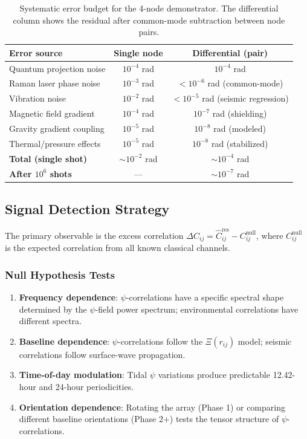 \documentclass[12pt,a4paper]{article}
\theoremstyle{remark}
\begin{document}
\begin{table}[H]
\centering
\begin{tabular}{lcc}
\toprule
\textbf{Error source} & \textbf{Single node} & \textbf{Differential (pair)} \\
\midrule
Quantum projection noise & $10^{-4}$ rad & $10^{-4}$ rad \\
Raman laser phase noise & $10^{-3}$ rad & $< 10^{-6}$ rad (common-mode) \\
Vibration noise & $10^{-2}$ rad & $< 10^{-5}$ rad (seismic regression) \\
Magnetic field gradient & $10^{-4}$ rad & $10^{-7}$ rad (shielding) \\
Gravity gradient coupling & $10^{-5}$ rad & $10^{-8}$ rad (modeled) \\
Thermal/pressure effects & $10^{-5}$ rad & $10^{-8}$ rad (stabilized) \\
\midrule
\textbf{Total (single shot)} & $\sim 10^{-2}$ rad & $\sim 10^{-4}$ rad \\
\textbf{After $10^6$ shots} & --- & $\sim 10^{-7}$ rad \\
\bottomrule
\end{tabular}
\caption{Systematic error budget for the 4-node demonstrator. The differential
column shows the residual after common-mode subtraction between node pairs.}
\label{tab:systematics}
\end{table}

\subsection{Signal Detection Strategy}\label{sec:detection-strategy}

The primary observable is the excess correlation
$\Delta C_{ij} = \hat{C}_{ij}^{\text{res}} - C_{ij}^{\text{null}}$,
where $C_{ij}^{\text{null}}$ is the expected correlation from all known
classical channels.

\subsubsection{Null Hypothesis Tests}

\begin{enumerate}
\item \textbf{Frequency dependence}: $\psi$-correlations have a specific
spectral shape determined by the $\psi$-field power spectrum; environmental
correlations have different spectra.
\item \textbf{Baseline dependence}: $\psi$-correlations follow the
$\Xi(r_{ij})$ model; seismic correlations follow surface-wave propagation.
\item \textbf{Time-of-day modulation}: Tidal $\psi$ variations produce
predictable 12.42-hour and 24-hour periodicities.
\item \textbf{Orientation dependence}: Rotating the array (Phase 1) or
comparing different baseline orientations (Phase 2+) tests the tensor
structure of $\psi$-correlations.
\end{enumerate}
\end{document}
